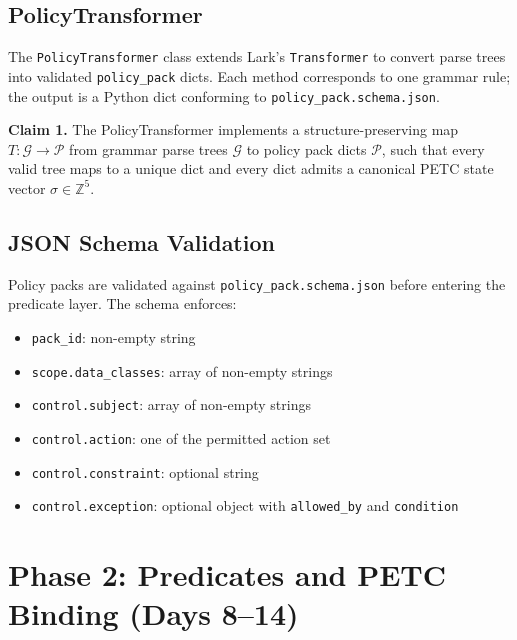 \documentclass[12pt,letterpaper]{article}
\theoremstyle{definition}
\theoremstyle{remark}
\begin{document}
\subsection{PolicyTransformer}

The \texttt{PolicyTransformer} class extends Lark's \texttt{Transformer} to convert
parse trees into validated \texttt{policy\_pack} dicts. Each method corresponds to one
grammar rule; the output is a Python dict conforming to \texttt{policy\_pack.schema.json}.

\begin{claimbox}
\textbf{Claim 1.} The PolicyTransformer implements a structure-preserving map
\(T: \mathcal{G} \to \mathcal{P}\) from grammar parse trees \(\mathcal{G}\) to
policy pack dicts \(\mathcal{P}\), such that every valid tree maps to a unique dict and
every dict admits a canonical PETC state vector \(\sigma \in \mathbb{Z}^5\).
\end{claimbox}

\subsection{JSON Schema Validation}

Policy packs are validated against \texttt{policy\_pack.schema.json} before entering
the predicate layer. The schema enforces:
\begin{itemize}
  \item \texttt{pack\_id}: non-empty string
  \item \texttt{scope.data\_classes}: array of non-empty strings
  \item \texttt{control.subject}: array of non-empty strings
  \item \texttt{control.action}: one of the permitted action set
  \item \texttt{control.constraint}: optional string
  \item \texttt{control.exception}: optional object with \texttt{allowed\_by} and
        \texttt{condition}
\end{itemize}

\newpage

\section{Phase 2: Predicates and PETC Binding (Days 8–14)}
\end{document}
